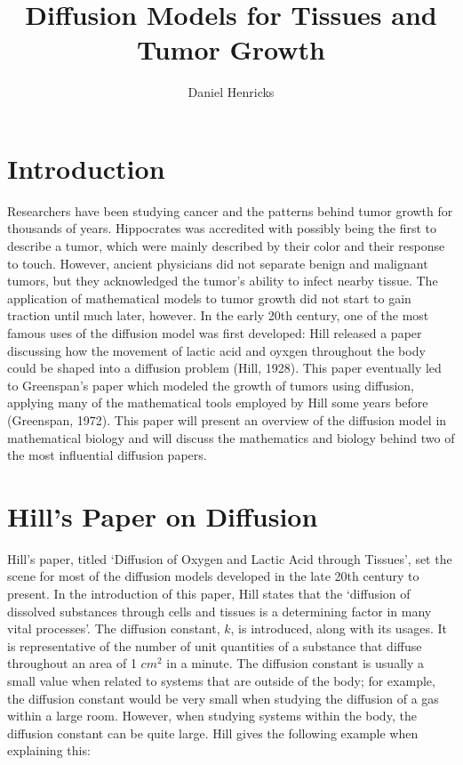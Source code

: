 \documentclass{article}
\title{Diffusion Models for Tissues and Tumor Growth}
\author{Daniel Henricks}
\begin{document}
\maketitle

\section{Introduction}

Researchers have been studying cancer and the patterns behind tumor growth for thousands of years. Hippocrates
was accredited with possibly being the first to describe a tumor, which were mainly described by their color
and their response to touch. However, ancient physicians did not separate benign and malignant tumors, but they
acknowledged the tumor's ability to infect nearby tissue. The application of mathematical models to tumor growth
did not start to gain traction until much later, however. In the early 20th century, one of the most famous uses of
the diffusion model was first developed: Hill released a paper discussing how the movement of lactic acid
and oyxgen throughout the body could be shaped into a diffusion problem (Hill, 1928). This paper eventually led to
Greenspan's paper which modeled the growth of tumors using diffusion, applying many of the mathematical tools employed
by Hill some years before (Greenspan, 1972). This paper will present an overview of the diffusion model in mathematical
biology and will discuss the mathematics and biology behind two of the most influential diffusion papers.

\section{Hill's Paper on Diffusion}

Hill's paper, titled `Diffusion of Oxygen and Lactic Acid through Tissues', set the scene for most of the diffusion models
developed in the late 20th century to present. In the introduction of this paper, Hill states that the
`diffusion of dissolved substances through cells and tissues is a determining factor in many vital processes'.
The diffusion constant, $k$, is introduced, along with its usages. It is representative of the number of unit quantities
of a substance that diffuse throughout an area of 1 $cm^2$ in a minute. The diffusion constant is usually a small value
when related to systems that are outside of the body; for example, the diffusion constant would be very small when studying
the diffusion of a gas within a large room. However, when studying systems within the body, the diffusion constant can be quite large.
Hill gives the following example when explaining this:
\end{document}
